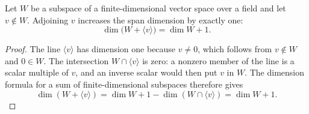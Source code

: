 \begin{helper}
Let $W$ be a subspace of a finite-dimensional vector space over a field and
let $v\notin W$.  Adjoining $v$ increases the span dimension by exactly one:
\[
 \dim\bigl(W+\langle v\rangle\bigr)=\dim W+1.
\]
\end{helper}
\begin{proof}
The line $\langle v\rangle$ has dimension one because $v\ne0$, which follows
from $v\notin W$ and $0\in W$.  The intersection
$W\cap\langle v\rangle$ is zero: a nonzero member of the line is a scalar
multiple of $v$, and an inverse scalar would then put $v$ in $W$.  The
dimension formula for a sum of finite-dimensional subspaces therefore gives
\[
 \dim(W+\langle v\rangle)=\dim W+1-\dim(W\cap\langle v\rangle)
 =\dim W+1.
\]
\end{proof}
